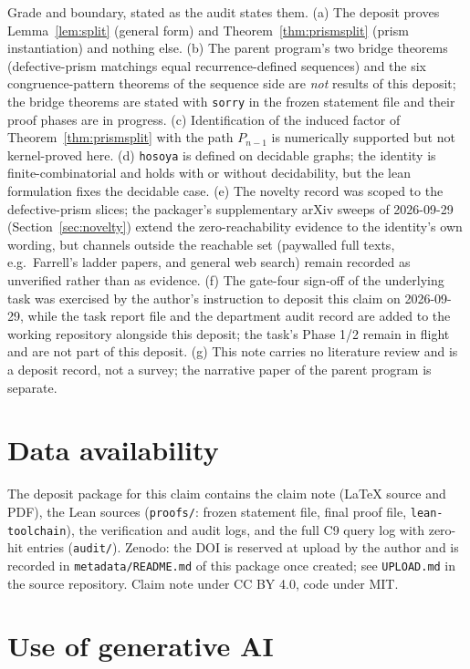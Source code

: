 \documentclass[11pt]{article}
\theoremstyle{definition}
\begin{document}
Grade and boundary, stated as the audit states them. (a) The deposit proves
Lemma~\ref{lem:split} (general form) and Theorem~\ref{thm:prismsplit}
(prism instantiation) and nothing else. (b) The parent program's two bridge
theorems (defective-prism matchings equal recurrence-defined sequences) and
the six congruence-pattern theorems of the sequence side are \emph{not}
results of this deposit; the bridge theorems are stated with \texttt{sorry} in
the frozen statement file and their proof phases are in progress. (c)
Identification of the induced factor of Theorem~\ref{thm:prismsplit} with the
path $P_{n-1}$ is numerically supported but not kernel-proved here.
(d) \texttt{hosoya} is defined on decidable graphs; the identity is
finite-combinatorial and holds with or without decidability, but the lean
formulation fixes the decidable case. (e) The novelty record was scoped to
the defective-prism slices; the packager's supplementary arXiv sweeps of
2026-09-29 (Section~\ref{sec:novelty}) extend the zero-reachability evidence
to the identity's own wording, but channels outside the reachable set
(paywalled full texts, e.g.\ Farrell's ladder papers, and general web search)
remain recorded as unverified rather than as evidence. (f) The gate-four
sign-off of the underlying task was exercised by the author's instruction to
deposit this claim on 2026-09-29, while the task report file and the
department audit record are added to the working repository alongside this
deposit; the task's Phase 1/2 remain in flight and are not part of this
deposit. (g) This note carries no literature review and is a deposit record,
not a survey; the narrative paper of the parent program is separate.

\section*{Data availability}

The deposit package for this claim contains the claim note (LaTeX source and
PDF), the Lean sources (\texttt{proofs/}: frozen statement file, final proof
file, \texttt{lean-toolchain}), the verification and audit logs, and the full
C9 query log with zero-hit entries (\texttt{audit/}). Zenodo: the DOI is
reserved at upload by the author and is recorded in
\texttt{metadata/README.md} of this package once created; see
\texttt{UPLOAD.md} in the source repository. Claim note under CC BY 4.0, code
under MIT.

\section*{Use of generative AI}
\end{document}
